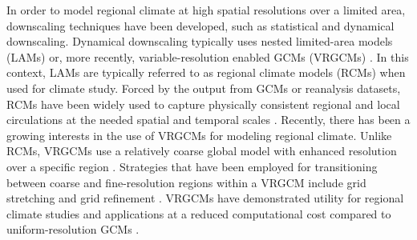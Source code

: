 \documentclass[ms,draft]{agutex}   %
\begin{document}
\begin{article}
In order to model regional climate at high spatial resolutions over a limited area, downscaling techniques have been developed, such as statistical and dynamical downscaling. Dynamical downscaling typically uses nested limited-area models (LAMs) or, more recently, variable-resolution enabled GCMs (VRGCMs) \citep{laprise2008regional}. In this context, LAMs are typically referred to as regional climate models (RCMs) when used for climate study. Forced by the output from GCMs or reanalysis datasets, RCMs have been widely used to capture physically consistent regional and local circulations at the needed spatial and temporal scales \citep{christensen2007regional, bukovsky2009precipitation, mearns2012north}. Recently, there has been a growing interests in the use of VRGCMs for modeling regional climate. Unlike RCMs, VRGCMs use a relatively coarse global model with enhanced resolution over a specific region \citep{staniforth1978variable, fox1997finite}.  Strategies that have been employed for transitioning between coarse and fine-resolution regions within a VRGCM include grid stretching \citep{fox1997finite, mcgregor2008updated} and grid refinement \citep{ringler2008multiresolution, skamarock2012multiscale, zarzycki2014aquaplanet}. VRGCMs have demonstrated utility for regional climate studies and applications at a reduced computational cost compared to uniform-resolution GCMs \citep{fox2006variable, rauscher2013exploring, zarzycki2015effects}. 


\end{article}
\end{document}
